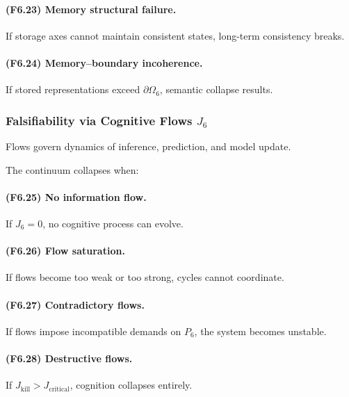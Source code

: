 \paragraph{(F6.23) Memory structural failure.}
If storage axes cannot maintain consistent states,
long-term consistency breaks.

\paragraph{(F6.24) Memory–boundary incoherence.}
If stored representations exceed $\partial\Omega_6$,
semantic collapse results.



\subsubsection{Falsifiability via Cognitive Flows \texorpdfstring{$J_6$}{J_6}}

Flows govern dynamics of inference, prediction, and model update.

The continuum collapses when:

\paragraph{(F6.25) No information flow.}
If $J_6=0$, no cognitive process can evolve.

\paragraph{(F6.26) Flow saturation.}
If flows become too weak or too strong,
cycles cannot coordinate.

\paragraph{(F6.27) Contradictory flows.}
If flows impose incompatible demands on $P_6$,
the system becomes unstable.

\paragraph{(F6.28) Destructive flows.}
If $J_{\mathrm{kill}}>J_{\mathrm{critical}}$,
cognition collapses entirely.



